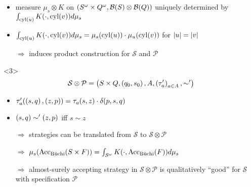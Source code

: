 \documentclass{beamer}
\begin{document}
\begin{frame}
\begin{overlayarea}{\textwidth}{0.8\textheight}
\begin{onlyenv}
\begin{itemize}
          \item measure $\mu_{s}\otimes K$ on $\left(S^{\omega}\times
            Q^{\omega}, \mathcal{B}(S)\otimes\mathcal{B}(Q)\right)$ uniquely
            determined by $\int_{\operatorname{cyl}(u)}K(\cdot, \operatorname{cyl}(v))d\mu_{s}$
          \item $\int_{\operatorname{cyl}(u)}K(\cdot, \operatorname{cyl}(v))d\mu_{s} =
            \mu_{s}(\operatorname{cyl}(u))\cdot\mu_{u}(\operatorname{cyl}(v))$ for $\left\vert{u}\right\vert = \left\vert{v}\right\vert$
          \item[$\Rightarrow$] induces product construction for
            $\mathcal{S}$ and $\mathcal{P}$
        \end{itemize}
      \end{onlyenv}
      \begin{onlyenv}<3>
        \begin{equation*}
          \mathcal{S}\otimes\mathcal{P} = \left(
            S\times Q, \left(q_{0}, s_{0}\right), A, \left(\tau_{a}'\right)_{a\in A},
            \sim'
          \right)
        \end{equation*}
        \begin{itemize}
          \item $\tau_{a}'(\left(s, q\right), \left(z, p\right)) = \tau_{a}(s, z)
            \cdot \delta(p, s, q)$
          \item $\left(s, q\right)\sim'\left(z, p\right)$ iff $s\sim z$
          \item[$\Rightarrow$] strategies can be translated from
            $\mathcal{S}$ to $\mathcal{S}\otimes\mathcal{P}$
          \item[$\Rightarrow$] $\mu_{s}(\operatorname{Acc}_{\operatorname{B\ddot{u}chi}}(S\times F)) =
            \int_{S^{\omega}}K(\cdot, \operatorname{Acc}_{\operatorname{B\ddot{u}chi}}(F))d\mu_{s}$
          \item[$\Rightarrow$] almost-surely accepting strategy in
            $\mathcal{S}\otimes\mathcal{P}$ is qualitatively \enquote{good}
            for $\mathcal{S}$ with specification $\mathcal{P}$
        \end{itemize}
      \end{onlyenv}
  \end{overlayarea}
\end{frame}
\end{document}
